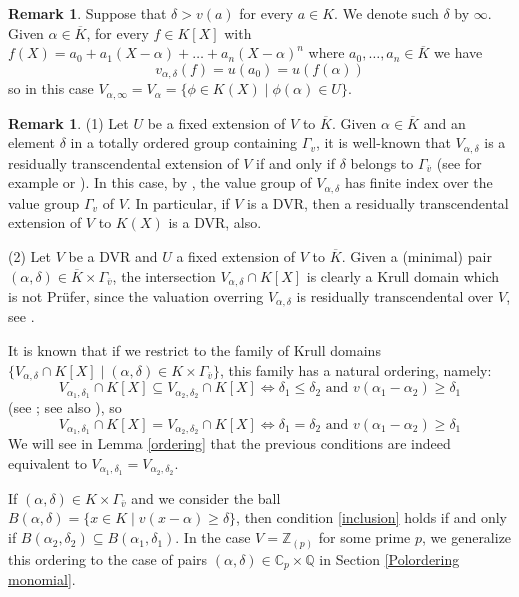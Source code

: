 \documentclass[10pt]{article}
\numberwithin{equation}{section}
\theoremstyle{definition}
\newtheorem{Rem}[equation]{Remark}
\theoremstyle{definition}
\newcommand{\Q}{\mathbb{Q}}
\newcommand{\Z}{\mathbb{Z}}
\newcommand{\C}{\mathbb{C}}
\newcommand{\olK}{\overline{K}}
\newcommand{\ov}{\overline{v}}
\newcommand\rc { \color{red}}
\begin{document}
\begin{Rem}\label{ra rt}%
Suppose that $\delta>v(a)$ for every $a\in K$. We denote such $\delta$ by $\infty$. Given $\alpha\in \overline{K}$, for every $f\in K[X]$ with $f(X)=a_0+a_1(X-\alpha)+\ldots+a_n(X-\alpha)^n$ where $a_0,\ldots,a_n\in\olK$ we have
$$v_{\alpha,\delta}(f)=u(a_0)=u(f(\alpha))$$
so in this case $V_{\alpha,\infty}=V_{\alpha}=\{\phi\in K(X)\mid \phi(\alpha)\in U\}$.
\end{Rem}

\begin{Rem}\label{remark rt}
(1) Let $U$ be a fixed extension of $V$ to $\overline{K}$. 
Given $\alpha\in\overline{K}$ and an element $\delta$ in a totally ordered group containing $\Gamma_v$, 
it is well-known that $V_{\alpha,\delta}$ is a residually transcendental extension of $V$ 
if and only if $\delta$ belongs to $\Gamma_{\ov}$ (see for example \cite{APZTheorem}  or \cite[Lemma 3.5]{PerPrufer}). 
In this case, by \cite[Theorem 2.1]{APZTheorem}, the value group of $V_{\alpha,\delta}$ has finite index over the value group $\Gamma_v$ of $V$. 
In particular, if $V$ is a DVR, then a residually transcendental extension of $V$ to $K(X)$ is a DVR, also.

(2) Let $V$ be a DVR and $U$ a fixed extension of $V$ to $\olK$. Given a (minimal) pair $(\alpha,\delta)\in\overline{K}\times\Gamma_{\overline v}$,
the intersection $V_{\alpha,\delta}\cap K[X]$ is clearly a Krull domain which is not Pr\"ufer, since the valuation overring $V_{\alpha,\delta}$ is residually transcendental over $V$, see \cite[Theorem 3.15]{PerPrufer}. 

It is known that if we restrict to the family of Krull domains $\{V_{\alpha,\delta}\cap K[X]\mid(\alpha,\delta)\in K\times\Gamma_{\overline v}\}$, this family has a natural ordering, namely:
\begin{equation}\label{inclusion}
V_{\alpha_1,\delta_1}\cap K[X]\subseteq V_{\alpha_2,\delta_2}\cap K[X]\Leftrightarrow \delta_1\leq\delta_2
\text{ and }v(\alpha_1-\alpha_2)\geq\delta_1
\end{equation}
(see \cite[Proposition 1.1]{APZAll}; see also \cite[Remark 3.10]{PerPrufer}), so 
\begin{equation}\label{equality monomials}
V_{\alpha_1,\delta_1}\cap K[X]= V_{\alpha_2,\delta_2}\cap K[X]\Leftrightarrow \delta_1=\delta_2 \text{ and } v(\alpha_1-\alpha_2)\geq \delta_1
\end{equation}
We will see in Lemma \ref{ordering} that the previous conditions are indeed equivalent to $V_{\alpha_1,\delta_1}= V_{\alpha_2,\delta_2}$.

 If $(\alpha,\delta)\in K\times \Gamma_{\overline{v}}$ and we consider the ball $B(\alpha,\delta)=\{x\in K\mid v(x-\alpha)\geq \delta\}$, then condition \eqref{inclusion} holds if and only if $B(\alpha_2,\delta_2)\subseteq B(\alpha_1,\delta_1)$.
In the case $V=\Z_{(p)}$ for some prime $p$, we generalize this ordering to the case of pairs $(\alpha,\delta)\in\C_p\times\Q$ in Section \ref{Polordering monomial}.
\end{Rem}
\end{document}

